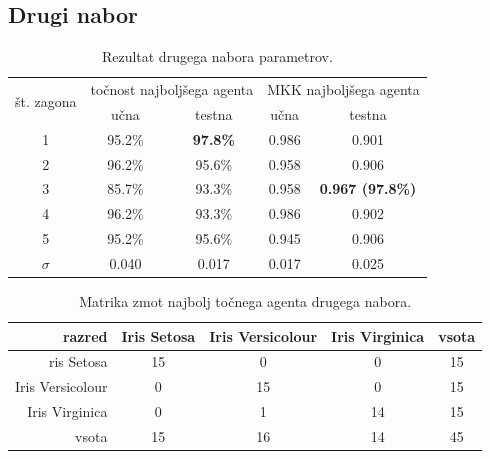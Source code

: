 \subsection{Drugi nabor}\label{subsec:dodatek-iris-drugi-nabor}
\begin{table}[H]
    \begin{center}
        \begin{tabular}{|| c | c c || c c ||}
            \hline
            \multirow{2}{*}{št. zagona} & \multicolumn{2}{c||}{točnost najboljšega agenta} & \multicolumn{2}{c||}{MKK najboljšega agenta} \\ \cline{2-5}
            & učna   & testna          & učna  & testna                  \\
            \hline
            1        & 95.2\% & \textbf{97.8\%} & 0.986 & 0.901                   \\
            \hline
            2        & 96.2\% & 95.6\%          & 0.958 & 0.906                   \\
            \hline
            3        & 85.7\% & 93.3\%          & 0.958 & \textbf{0.967 (97.8\%)} \\
            \hline
            4        & 96.2\% & 93.3\%          & 0.986 & 0.902                   \\
            \hline
            5        & 95.2\% & 95.6\%          & 0.945 & 0.906                   \\
            \hline
            $\sigma$ & 0.040  & 0.017           & 0.017 & 0.025                   \\
            \hline
        \end{tabular}
    \end{center}
    \caption{Rezultat drugega nabora parametrov.}
    \label{tab:iris_result_2}
\end{table}

\begin{table}[H]
    \centering
    \begin{tabular}{||rcccc||}
        \hline
        razred           & Iris Setosa & Iris Versicolour & Iris Virginica & vsota \\ \hline
        ris Setosa       & 15          & 0                & 0              & 15    \\ \hline
        Iris Versicolour & 0           & 15               & 0              & 15    \\ \hline
        Iris Virginica   & 0           & 1                & 14             & 15    \\ \hline
        vsota            & 15          & 16               & 14             & 45    \\ \hline
    \end{tabular}
    \caption{Matrika zmot najbolj točnega agenta drugega nabora.}
    \label{tab:iris_acc_2}
\end{table}

